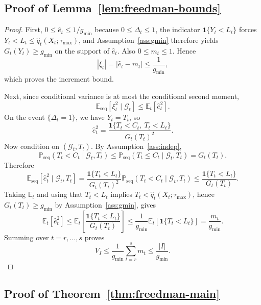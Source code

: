\documentclass[11pt]{article}
\newcommand{\E}{\mathbb{E}}
\newcommand{\Prob}{\mathbb{P}}
\newcommand{\1}{\mathbf{1}}
\newcommand{\seq}{\mathrm{seq}}
\newcommand{\cG}{\mathcal{G}}
\begin{document}
\subsection{Proof of Lemma~\ref{lem:freedman-bounds}}
\label{app:proof-freedman-bounds}

\begin{proof}
First, \(0\le \hat e_t\le 1/g_{\min}\) because \(0\le \Delta_t\le 1\), the indicator \(\mathbf 1\{Y_t<L_t\}\) forces \(Y_t<L_t\le \hat q_t(X_t;\tau_{\max})\), and Assumption~\ref{ass:gmin} therefore yields \(G_t(Y_t)\ge g_{\min}\) on the support of \(\hat e_t\). Also \(0\le m_t\le 1\). Hence
\[
|\xi_t|=|\hat e_t-m_t|\le \frac{1}{g_{\min}},
\]
which proves the increment bound.

Next, since conditional variance is at most the conditional second moment,
\[
\E_{\seq}[\xi_t^2\mid \cG_t]\le \E_t[\hat e_t^2].
\]
On the event \(\{\Delta_t=1\}\), we have \(Y_t=T_t\), so
\[
\hat e_t^2
=
\frac{\1\{T_t<C_t,\ T_t< L_t\}}{G_t(T_t)^2}.
\]
Now condition on \((\cG_t,T_t)\). By Assumption~\ref{ass:indep},
\[
\Prob_{\seq}(T_t<C_t\mid \cG_t,T_t)\le \Prob_{\seq}(T_t\le C_t\mid \cG_t,T_t)=G_t(T_t).
\]
Therefore
\[
\E_{\seq}[\hat e_t^2\mid \cG_t,T_t]
=
\frac{\1\{T_t< L_t\}}{G_t(T_t)^2}\Prob_{\seq}(T_t<C_t\mid \cG_t,T_t)
\le
\frac{\1\{T_t< L_t\}}{G_t(T_t)}.
\]
Taking \(\E_t\) and using that \(T_t<L_t\) implies \(T_t<\hat q_t(X_t;\tau_{\max})\), hence \(G_t(T_t)\ge g_{\min}\) by Assumption~\ref{ass:gmin}, gives
\[
\E_t[\hat e_t^2]
\le
\E_t\!\left[
\frac{\1\{T_t< L_t\}}{G_t(T_t)}
\right]
\le
\frac{1}{g_{\min}}\E_t[\1\{T_t< L_t\}]
=
\frac{m_t}{g_{\min}}.
\]
Summing over \(t=r,\dots,s\) proves
\[
V_I\le \frac{1}{g_{\min}}\sum_{t=r}^s m_t \le \frac{|I|}{g_{\min}}.
\]
\end{proof}

\subsection{Proof of Theorem~\ref{thm:freedman-main}}
\label{app:proof-hp}
\end{document}
